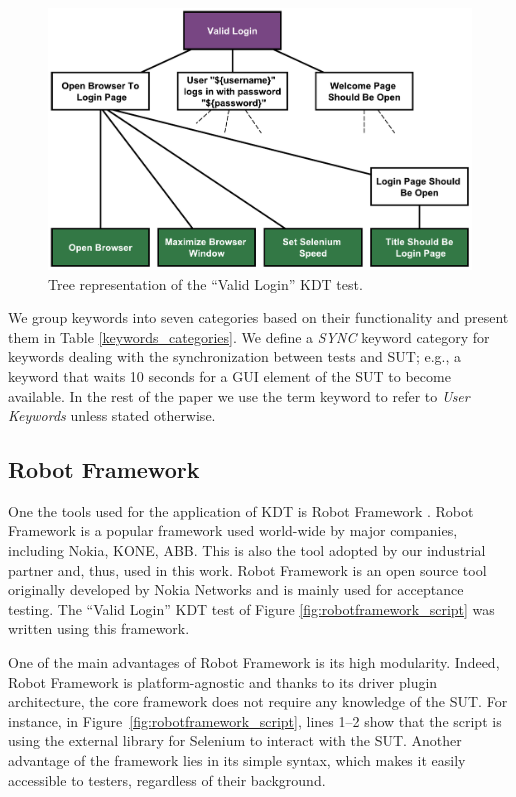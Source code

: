 \begin{figure}[t!]
\centering
\includegraphics[width=\columnwidth]{figures/evolution/robotframework_tree.pdf}
\caption{Tree representation of the ``Valid Login'' KDT test.}
\label{fig:robotframework_tree}
\end{figure}

We group keywords into seven categories based on their functionality and present them in Table \ref{keywords_categories}. We define a \emph{SYNC}
keyword category for keywords dealing with the synchronization between tests and SUT; e.g., a keyword that waits 10 seconds for a GUI element of the SUT to become available. In the rest of the paper we use the term keyword to refer to \emph{User Keywords} unless stated otherwise.

\subsection{Robot Framework}
\label{robot_framework}

One the tools used for the application of KDT is Robot Framework \cite{RobotFramework2020}. Robot Framework is a popular framework used world-wide by major companies, including Nokia, KONE, ABB. This is also the tool adopted by our industrial partner and, thus, used in this work. Robot Framework is an open source tool originally developed by Nokia Networks and is mainly used for acceptance testing. The ``Valid Login'' KDT test of Figure \ref{fig:robotframework_script} was written using this framework.

One of the main advantages of Robot Framework is its high modularity.  Indeed, Robot Framework is platform-agnostic and thanks to its driver plugin architecture, the core framework does not require any knowledge of the SUT. For instance, in Figure~\ref{fig:robotframework_script}, lines 1--2 show that the script is using the external library for Selenium to interact with the SUT. Another advantage of the framework lies in its simple syntax, which makes it easily accessible to testers, regardless of their background.

